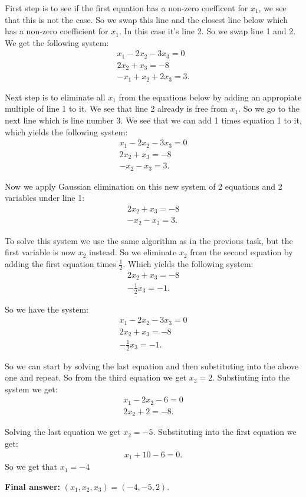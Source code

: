 \documentclass[10pt]{article}
\begin{document}
\begin{solution}[]  \label{sol:}
First step is to see if the first equation has a non-zero coefficent for
\(x_1\), we see that this is not the case. So we swap this line and the closest
line below which has a non-zero coefficient for \(x_1\). In this case it's
line 2. So we swap line 1 and 2. We get the following system:
\begin{align*}
x_1 - 2x_2 - 3x_3 = 0 \\
2x_2 + x_3 = -8 \\
-x_1 + x_2 + 2x_3 = 3
.
\end{align*}

Next step is to eliminate all \(x_1\) from the equations below by adding
an appropiate multiple of line 1 to it. We see that line 2 already is
free from \(x_1\). So we go to the next line which is line number 3. We see
that we can add 1 times equation 1 to it, which yields the following
system:
\begin{align*}
x_1 - 2x_2 - 3x_3 = 0 \\
2x_2 + x_3 = -8 \\
-x_2 - x_3 = 3
.
\end{align*}

Now we apply Gaussian elimination on this new system of 2 equations and
2 variables under line 1:
\begin{align*}
2x_2 + x_3 = -8 \\
-x_2 - x_3 = 3
.
\end{align*}

To solve this system we use the same algorithm as in the previous task, but the
first variable is now \(x_2\) instead. So we eliminate \(x_2\) from the second equation
by adding the first equation times \(\frac{1}{2}\). Which yields the following system:
\begin{align*}
2x_2 + x_3 = -8 \\
- \frac{1}{2} x_3 = -1
.
\end{align*}

So we have the system:
\begin{align*}
x_1 - 2x_2 - 3x_3 = 0 \\
2x_2 + x_3 = -8 \\
-\frac{1}{2}x_3 = -1
.
\end{align*}

So we can start by solving the last equation and then substituting into the above
one and repeat. So from the third equation we get \(x_3 = 2\). Substiuting into the
system we get:
\begin{align*}
x_1 - 2x_2 - 6 = 0 \\
2x_2 + 2 = -8
.
\end{align*}

Solving the last equation we get \(x_2 = -5\). Substituting into the first
equation we get:
\begin{align*}
x_1 + 10 -6 = 0
.
\end{align*}
So we get that \(x_1 = -4\)


\textbf{Final answer:} \((x_1 , x_2 , x_3) = (-4, -5, 2)\).

\end{solution}
\end{document}
